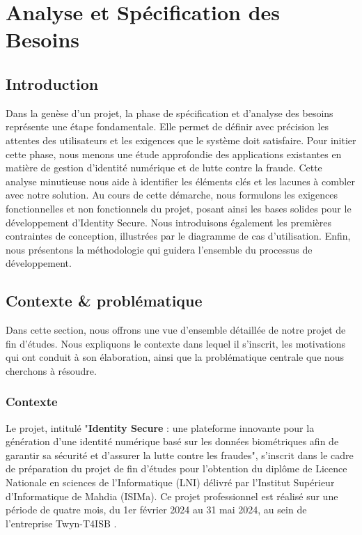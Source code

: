 \chapter{Analyse et Spécification des Besoins}





\section*{Introduction}

Dans la genèse d'un projet, la phase de spécification et d'analyse des besoins représente
une étape fondamentale. Elle permet de définir avec précision les attentes des utilisateurs et les exigences que le système doit satisfaire. Pour initier cette phase, nous menons une étude approfondie des applications existantes en matière de gestion d'identité numérique et de lutte contre la fraude. Cette analyse minutieuse nous aide à identifier les éléments clés et les lacunes à combler avec notre solution. Au cours de cette démarche, nous formulons les exigences fonctionnelles et non fonctionnels du projet, posant ainsi les bases solides pour le développement d'Identity Secure. Nous introduisons également les premières contraintes de conception, illustrées par le diagramme de cas d'utilisation. Enfin, nous présentons la méthodologie qui guidera l'ensemble du processus de développement.
\section{Contexte \& problématique}

Dans cette section, nous offrons une vue d'ensemble détaillée de notre projet de fin d'études. Nous expliquons le contexte dans lequel il s'inscrit, les motivations qui ont conduit à son élaboration, ainsi que la problématique centrale que nous cherchons à résoudre.

\subsection{Contexte}
Le projet, intitulé "\textbf{Identity Secure} :  une plateforme innovante pour la génération d'une identité numérique basé sur les données biométriques afin de garantir sa sécurité et d'assurer la lutte contre les fraudes", s'inscrit dans le cadre de préparation du projet de fin d'études pour l'obtention du diplôme de Licence Nationale en sciences de l'Informatique (LNI) délivré par l'Institut Supérieur d'Informatique de Mahdia (ISIMa). Ce projet professionnel est réalisé sur une période de quatre mois, du 1er février 2024 au 31 mai 2024, au sein de l'entreprise Twyn-T4ISB \cite{b1}.

